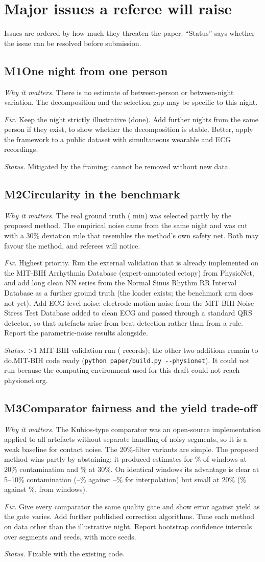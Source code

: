 \documentclass[11pt,a4paper]{article}
\newcommand{\issue}[5]{%
  \needspace{6\baselineskip}%
  \subsection*{#1\quad #2}
  \textit{Why it matters.} #3\par
  \textit{Fix.} #4\par
  \textit{Status.} #5\par}
\newcommand{\cmd}[1]{\texttt{\small #1}}
\begin{document}
\section{Major issues a referee will raise}
Issues are ordered by how much they threaten the paper. ``Status'' says whether the issue can be resolved before submission.

\issue{M1}{One night from one person}
{There is no estimate of between-person or between-night variation. The decomposition and the selection gap may be specific to this night.}
{Keep the night strictly illustrative (done). Add further nights from the same person if they exist, to show whether the decomposition is stable. Better, apply the framework to a public dataset with simultaneous wearable and ECG recordings.}
{Mitigated by the framing; cannot be removed without new data.}

\issue{M2}{Circularity in the benchmark}
{The real ground truth (\realMinutes{} min) was selected partly by the proposed method. The empirical noise came from the same night and was cut with a 30\% deviation rule that resembles the method's own safety net. Both may favour the method, and referees will notice.}
{Highest priority. Run the external validation that is already implemented on the MIT-BIH Arrhythmia Database (expert-annotated ectopy) from PhysioNet,\autocite{goldberger2000,moody2001} and add long clean NN series from the Normal Sinus Rhythm RR Interval Database as a further ground truth (the loader exists; the benchmark arm does not yet). Add ECG-level noise: electrode-motion noise from the MIT-BIH Noise Stress Test Database\autocite{moody1984} added to clean ECG and passed through a standard QRS detector, so that artefacts arise from beat detection rather than from a rule. Report the parametric-noise results alongside.}
{\ifnum\mitRecords>1 MIT-BIH validation run (\mitRecords{} records); the other two additions remain to do.\else MIT-BIH code ready (\cmd{python paper/build.py -{}-physionet}). It could not run because the computing environment used for this draft could not reach physionet.org.\fi}

\issue{M3}{Comparator fairness and the yield trade-off}
{The Kubios-type comparator was an open-source implementation applied to all artefacts without separate handling of noisy segments, so it is a weak baseline for contact noise. The 20\%-filter variants are simple. The proposed method wins partly by abstaining: it produced estimates for \benchProposedYieldTwenty\% of windows at 20\% contamination and \benchProposedYieldThirty\% at 30\%. On identical windows its advantage is clear at 5--10\% contamination (\swProposedLowMin--\swProposedLowMax\% against \swInterpLowMin--\swInterpLowMax\% for interpolation) but small at 20\% (\swProposedTwenty\% against \swInterpTwenty\%, from \swNTwenty{} windows).}
{Give every comparator the same quality gate and show error against yield as the gate varies. Add further published correction algorithms. Tune each method on data other than the illustrative night. Report bootstrap confidence intervals over segments and seeds, with more seeds.}
{Fixable with the existing code.}
\end{document}
